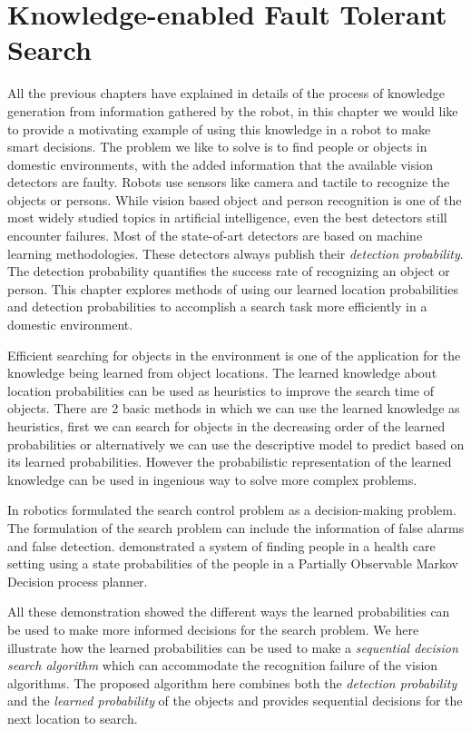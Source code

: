 
\chapter{Knowledge-enabled Fault Tolerant Search}
\label{cha: search}

All the previous chapters have explained in details of the process of knowledge generation from information gathered by the robot, in this chapter we would like to provide a motivating example of using this knowledge in a robot to make smart decisions. The problem we like to solve is to find people or objects in domestic environments, with the added information that the available vision detectors are faulty. Robots use sensors like camera and tactile  to recognize the objects or persons. While vision based object and person recognition is one of the most widely studied topics in artificial intelligence, even the best detectors still encounter failures. Most of the state-of-art detectors are based on machine learning methodologies. These detectors always publish their \emph{detection probability}. The detection probability quantifies the success rate of recognizing an object or person. This chapter explores methods of using our learned location probabilities and detection probabilities to accomplish a search task more efficiently in a domestic environment. 


Efficient searching for objects in the environment is one of the application for the knowledge being learned from object locations. The learned knowledge about location probabilities can be used as heuristics to improve the search time of objects. There are 2 basic methods in which we can use the learned knowledge as heuristics, first we can search for objects in the decreasing order of the learned probabilities or alternatively we can use the descriptive model to predict based on its learned probabilities. However the probabilistic representation of the learned knowledge can be used in ingenious way to solve more complex problems. 

In robotics \cite{chung2007decision} formulated the search control problem as a decision-making problem. The formulation of the search problem can include the information of false alarms and false detection. \cite{roy2003planning} demonstrated a system of finding people in a health care setting using a state probabilities of the people in a Partially Observable Markov Decision process planner. 


All these demonstration showed the different ways the learned probabilities can be used to make more informed decisions for the search problem. We here illustrate how the learned probabilities can be used to make a \emph{sequential decision search algorithm} which can accommodate the recognition failure of the vision algorithms. The proposed algorithm here combines both the \emph{detection probability} and the \emph{learned probability} of the objects and provides sequential decisions for the next location to search.


